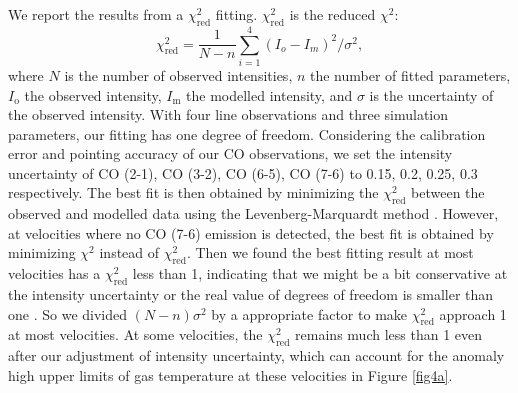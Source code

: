 We report the results from a $\chi^2_{\mathrm{red}}$ fitting. $\chi^2_{\mathrm{red}}$ is the reduced $\chi^2$: 
\begin{equation}
\chi^2_{\mathrm{red}} = \frac{1}{N - n} \sum_{i=1}^{4}(I_o - I_m)^2/\sigma^2,
\end{equation}
where $N$ is the number of observed intensities, $n$ the number of fitted parameters, $I_\mathrm{o}$ the observed intensity, $I_\mathrm{m}$ the modelled intensity, and $\sigma$ is the uncertainty of the observed intensity. With four line observations and three simulation parameters, our fitting has one degree of freedom. Considering the calibration error and pointing accuracy of our CO observations, we set the intensity uncertainty of CO (2-1), CO (3-2), CO (6-5), CO (7-6) to 0.15, 0.2, 0.25, 0.3 respectively. The best fit is then obtained by minimizing the $\chi^2_{\mathrm{red}}$ between the observed and modelled data using the Levenberg-Marquardt method \citep{1992nrfa.book.....P}. However, at velocities where no CO (7-6) emission is detected, the best fit is obtained by minimizing $\chi^2$ instead of $\chi^2_{\mathrm{red}}$. Then we found the best fitting result at most velocities has a $\chi^2_{\mathrm{red}}$ less than 1, indicating that we might be a bit conservative at the intensity uncertainty or the real value of degrees of freedom is smaller than one \citep{2010arXiv1012.3754A}. So we divided $(N - n)\sigma^2$ by a appropriate factor to make $\chi^2_{\mathrm{red}}$ approach 1 at most velocities. At some velocities, the $\chi_{\mathrm{red}}^2$ remains much less than 1 even after our adjustment of intensity uncertainty, which can account for the anomaly high upper limits of gas temperature at these velocities in Figure \ref{fig4a}. 

